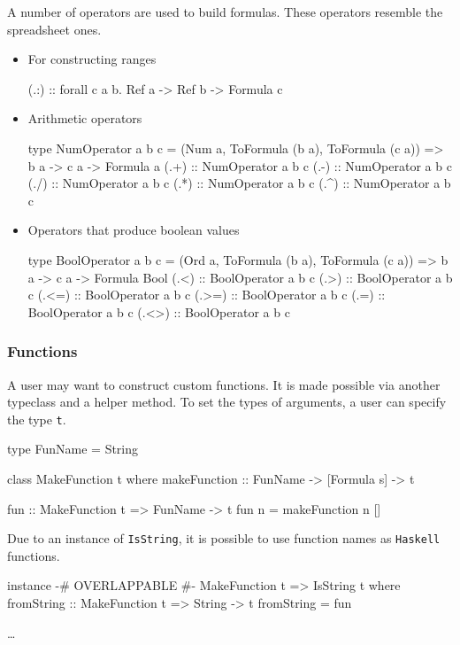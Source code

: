 A number of operators are used to build formulas. These operators resemble the spreadsheet ones.

\begin{itemize}
  \item For constructing ranges
  \begin{mycode}
  (.:) :: forall c a b. Ref a -> Ref b -> Formula c
  \end{mycode}
  \item Arithmetic operators
  \begin{mycode}
  type NumOperator a b c = (Num a, ToFormula (b a), ToFormula (c a)) => b a -> c a -> Formula a
  (.+) :: NumOperator a b c
  (.-) :: NumOperator a b c
  (./) :: NumOperator a b c
  (.*) :: NumOperator a b c
  (.^) :: NumOperator a b c
  \end{mycode}
  \item Operators that produce boolean values
  \begin{mycode}
  type BoolOperator a b c = (Ord a, ToFormula (b a), ToFormula (c a)) => b a -> c a -> Formula Bool
  (.<) :: BoolOperator a b c
  (.>) :: BoolOperator a b c
  (.<=) :: BoolOperator a b c
  (.>=) :: BoolOperator a b c
  (.=) :: BoolOperator a b c
  (.<>) :: BoolOperator a b c
  \end{mycode}
\end{itemize}

\subsubsection{Functions}

A user may want to construct custom functions. It is made possible via another typeclass and a helper method. To set the types of arguments, a user can specify the type \texttt{t}.

\begin{mycode}
type FunName = String

class MakeFunction t where
  makeFunction :: FunName -> [Formula s] -> t

fun :: MakeFunction t => FunName -> t
fun n = makeFunction n []
\end{mycode}

Due to an instance of \texttt{IsString}, it is possible to use function names as \texttt{Haskell} functions.

\begin{mycode}
instance {-# OVERLAPPABLE #-} MakeFunction t => IsString t where
  fromString :: MakeFunction t => String -> t
  fromString = fun
\end{mycode}


\ldots